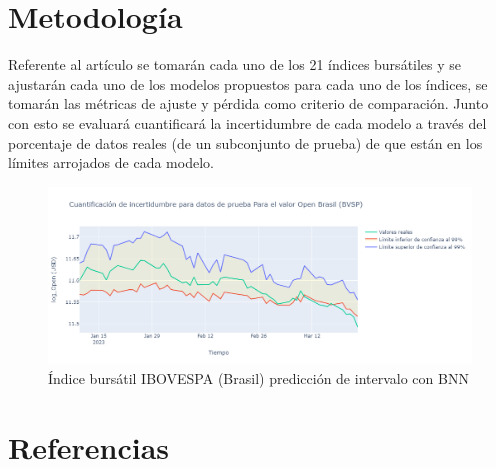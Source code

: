 \documentclass[twoside]{article}
\theoremstyle{definition}
\theoremstyle{example}
\theoremstyle{remark}
\numberwithin{equation}{section}%
\begin{document}
\section{Metodología}
  Referente al artículo se tomarán cada uno de los 21 índices bursátiles y se ajustarán cada uno de los modelos propuestos para cada uno de los índices, se tomarán las métricas de ajuste y pérdida como criterio de comparación. Junto con esto se evaluará cuantificará la incertidumbre de cada modelo a través del porcentaje de datos reales (de un subconjunto de prueba) de que están en los límites arrojados de cada modelo. 

\begin{figure}[ht]
  \centering
  \includegraphics[width=1.0\textwidth]{Brasil.png}
  \caption{Índice bursátil IBOVESPA (Brasil) predicción de intervalo con BNN}
\end{figure}

\section{Referencias}
\end{document}
